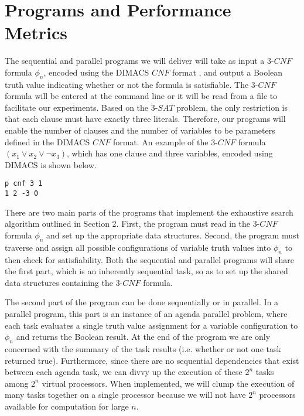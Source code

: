 \documentclass[paper=a4, fontsize=11pt]{scrartcl} %
\begin{document}
\section{Programs and Performance Metrics}
The sequential and parallel programs we will deliver will take as input 
a $3$-$CNF$ formula $\phi_n$, encoded using the DIMACS $CNF$ format \cite{dimacs}, 
and output a Boolean truth value indicating whether or not the 
formula is satisfiable. The $3$-$CNF$ formula will be entered at the command 
line or it will be read from a file to facilitate our experiments. Based on 
the $3$-$SAT$ problem, the only restriction is that each clause must have 
exactly three literals. Therefore, our programs will enable the 
number of clauses and the number of variables 
to be parameters defined in the DIMACS $CNF$ format. An example of the 
$3$-$CNF$ formula $(x_1 \lor x_2 \lor \lnot x_3)$, which has one clause and three 
variables, encoded using DIMACS is shown below.
\begin{center}
\begin{lstlisting}[frame=single]
p cnf 3 1
1 2 -3 0
\end{lstlisting}
\end{center}
\vspace{-1em}
There are two main parts of the programs that implement the exhaustive search algorithm outlined
in Section 2. First, the program must read in the $3$-$CNF$ formula $\phi_n$ and set up 
the appropriate data structures. Second, the program must traverse 
and assign all possible configurations of variable truth 
values into $\phi_n$ to then check for satisfiability. Both the 
sequential and parallel programs will share the first part, which
is an inherently sequential task, so as to set up 
the shared data structures containing the $3$-$CNF$ formula.

The second part of the program can be done sequentially or in parallel. 
In a parallel program, this part is an instance of an agenda parallel problem, where each 
task evaluates a single truth value assignment for a variable configuration to $\phi_n$ and returns the Boolean result.
At the end of the program we are only concerned with the summary of the task results (i.e. whether or not
one task returned true). 
Furthermore, since there are no sequential dependencies that exist between each agenda task, we can divvy 
up the execution of these $2^n$ tasks among $2^n$ virtual processors. When 
implemented, we will clump the execution of many tasks together on a single 
processor because we will not have $2^n$ processors available for computation for large $n$. 
\end{document}
